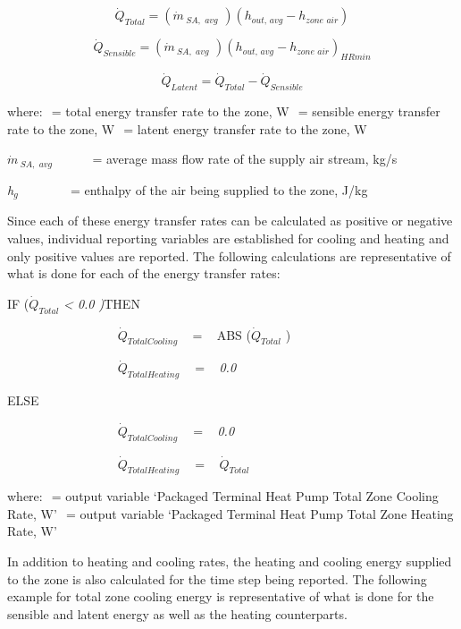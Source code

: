 \begin{equation}
{\dot Q_{Total}} = \left( {\dot m{\,_{SA,\,\,avg}}\,\,} \right)\left( {{h_{out,\,avg}} - {h_{zone\,\,air}}} \right)
\end{equation}

\begin{equation}
{\dot Q_{Sensible}} = \left( {\dot m{\,_{SA,\,\,avg}}\,\,} \right){\left( {{h_{out,\,avg}} - {h_{zone\,\,air}}} \right)_{HRmin}}
\end{equation}

\begin{equation}
{\dot Q_{Latent}} = {\dot Q_{Total}} - {\dot Q_{Sensible}}
\end{equation}

where: \(_{ }\) = total energy transfer rate to the zone, W \(_{ }\) = sensible energy transfer rate to the zone, W \(_{ }\) = latent energy transfer rate to the zone, W

\(\dot m{\,_{SA,\,\,avg}}\) ~~~~~ = average mass flow rate of the supply air stream, kg/s

\emph{h\(_{g}\)} ~~~~~~~ = enthalpy of the air being supplied to the zone, J/kg

Since each of these energy transfer rates can be calculated as positive or negative values, individual reporting variables are established for cooling and heating and only positive values are reported. The following calculations are representative of what is done for each of the energy transfer rates:

IF (\({\dot Q_{Total}}\) \emph{\textless{} 0.0 )}THEN

~~~~~~~~~~~~~~~~~ \({\dot Q_{TotalCooling}}\) ~ = ~ ABS (\({\dot Q_{Total}}\) )

~~~~~~~~~~~~~~~~~ \({\dot Q_{TotalHeating}}\) \(_{ }\)~ = ~ \emph{0.0}

ELSE

~~~~~~~~~~~~~~~~~ \({\dot Q_{TotalCooling}}\) \(_{ }\)~ = ~ \emph{0.0}

~~~~~~~~~~~~~~~~~ \({\dot Q_{TotalHeating}}\) \(_{ }\)~ = ~ \({\dot Q_{Total}}\)

where: \(_{ }\) = output variable `Packaged Terminal Heat Pump Total Zone Cooling Rate, W' \(_{ }\) = output variable `Packaged Terminal Heat Pump Total Zone Heating Rate, W'

In addition to heating and cooling rates, the heating and cooling energy supplied to the zone is also calculated for the time step being reported. The following example for total zone cooling energy is representative of what is done for the sensible and latent energy as well as the heating counterparts.


